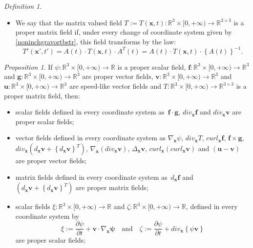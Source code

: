 \documentclass{article}
\newtheorem{proposition}{Proposition}[section]
\theoremstyle{definition}
\newtheorem{definition}{Definition}[section]
\theoremstyle{remark}
\renewcommand{\vec}[1]{\mathbf{#1}}
\newcommand{\R}{\mathbb{R}}
\newcommand{\er}{\eqref}
\newcommand{\R}{{\mathbb{R}}}
\newcommand{\er}{\eqref}
\newtheorem{proposition}{Proposition}
\newtheorem{definition}{Definition}
\begin{document}
\begin{definition}
\begin{itemize}
\item
We say that the matrix valued field $T:=T(\vec
x,t):\R^3\times[0,+\infty)\to\R^{3\times 3}$ is a proper matrix
field if, under every change of coordinate system given by
\er{noninchgravortbstr}, this field transforms by the law:
\begin{equation}\label{uguyytfddddgghjjghjjj}
T'(\vec x',t')=A(t)\cdot T(\vec x,t)\cdot A^T(t)=A(t)\cdot T(\vec
x,t)\cdot \left\{A(t)\right\}^{-1}.
\end{equation}
\end{itemize}
\end{definition}
\begin{proposition}\label{yghgjtgyrtrt}
If $\psi:\R^3\times[0,+\infty)\to\R$ is a proper scalar field, $\vec
f:\R^3\times[0,+\infty)\to\R^3$ and $\vec
g:\R^3\times[0,+\infty)\to\R^3$ are proper vector fields, $\vec
v:\R^3\times[0,+\infty)\to\R^3$ and $\vec
u:\R^3\times[0,+\infty)\to\R^3$ are speed-like vector fields and
$T:\R^3\times[0,+\infty)\to\R^{3\times 3}$ is a proper matrix field,
then:
\begin{itemize}
\item[{\bf(i)}] scalar fields defined in every coordinate system as $\,\vec f\cdot\vec g$, $div_{\vec x} \vec f$ and $div_{\vec x} \vec
v$ are proper scalar fields;

\item[{\bf(ii)}] vector fields defined in every coordinate system as $\nabla_{\vec x}\psi$, $div_{\vec x} T$, $curl_{\vec x}\vec
f$, $\vec f\times\vec g$,
$div_{\vec x}\left(d_{\vec x} \vec v+\left\{d_{\vec x} \vec
v\right\}^T\right)$, $\nabla_{\vec x}\left(div_{\vec x}\vec
v\right)$, $\Delta_{\vec x}\vec v$, $curl_{\vec x}\left(curl_{\vec
x}\vec v\right)$ and $(\vec u-\vec v)$ are proper vector fields;

\item[{\bf(iii)}] matrix fields defined in every coordinate system as $\,d_{\vec x} \vec f$ and $\left(d_{\vec x} \vec v+\left\{d_{\vec x} \vec v\right\}^T\right)$ are proper
matrix fields;

\item[{\bf(iv)}] scalar fields $\xi:\R^3\times[0,+\infty)\to\R$ and $\zeta:\R^3\times[0,+\infty)\to\R$, defined
in every coordinate system by
\begin{equation}\label{vfyutuyfffhhgfhgfhgtg}
\xi:=\frac{\partial\psi}{\partial t}+\vec v\cdot\nabla_{\vec x}\vec
\psi\quad \text{and}\quad \zeta:=\frac{\partial\psi}{\partial
t}+div_{\vec x}\left\{ \psi\vec v\right\}
\end{equation}
are proper scalar fields;


\end{itemize}
\end{proposition}
\end{document}
